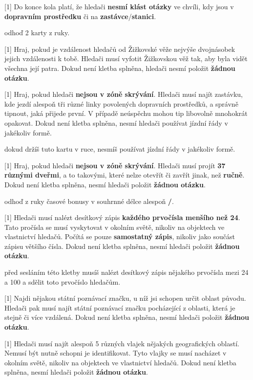 \begin{cards}
	 Do konce kola platí, že hledači \textbf{nesmí klást otázky} ve chvíli, kdy jsou v \textbf{dopravním prostředku} či na \textbf{zastávce}/\textbf{stanici}.

	\cost odhoď 2 karty z ruky.

	 Hraj, pokud je vzdálenost hledačů od Žižkovské věže nejvýše dvojnásobek jejich vzdálenosti k tobě. Hledači musí vyfotit Žižkovskou věž tak, aby byla vidět všechna její patra. Dokud není kletba splněna, hledači nesmí položit \textbf{žádnou otázku}.

	 Hraj, pokud hledači \textbf{nejsou v zóně skrývání}. Hledači musí najít zastávku, kde jezdí alespoň tři různé linky povolených dopravních prostředků, a správně tipnout, jaká přijede první. V případě neúspěchu mohou tip libovolně mnohokrát opakovat. Dokud není kletba splněna, nesmí hledači používat jízdní řády v jakékoliv formě.

	\cost dokud držíš tuto kartu v ruce, nesmíš používat jízdní řády v jakékoliv formě.

	 Hraj, pokud hledači \textbf{nejsou v zóně skrývání}. Hledači musí projít \textbf{37 různými dveřmi}, a to takovými, které nelze otevřít či zavřít jinak, než \textbf{ručně}. Dokud není kletba splněna, nesmí hledači položit \textbf{žádnou otázku}.

	\cost odhoď z ruky časové bonusy v souhrnné délce alespoň \textbf{\timecursefellowshipcost/}.

	 Hledači musí nalézt desítkový zápis \textbf{každého prvočísla menšího než 24}. Tato pročísla se musí vyskytovat v okolním světě, nikoliv na objektech ve vlastnictví hledačů. Počítá se pouze \textbf{samostatný zápis}, nikoliv jako součást zápisu většího čísla. Dokud není kletba splněna, nesmí hledači položit \textbf{žádnou otázku}.

	\cost před sesláním této kletby musíš nalézt desítkový zápis nějakého prvočísla mezi 24 a 100 a sdělit toto prvočíslo hledačům.

	 Najdi nějakou státní poznávací značku, u níž jsi schopen určit oblast původu. Hledači pak musí najít státní poznávací značku pocházející z oblasti, která je stejně či více vzdálená. Dokud není kletba splněna, nesmí hledači položit \textbf{žádnou otázku}.

	 Hledači musí najít alespoň 5 různých vlajek nějakých geografických oblastí. Nemusí být nutně schopni je identifikovat. Tyto vlajky se musí nacházet v okolním světě, nikoliv na objektech ve vlastnictví hledačů. Dokud není kletba splněna, nesmí hledači položit \textbf{žádnou otázku}.


\end{cards}
